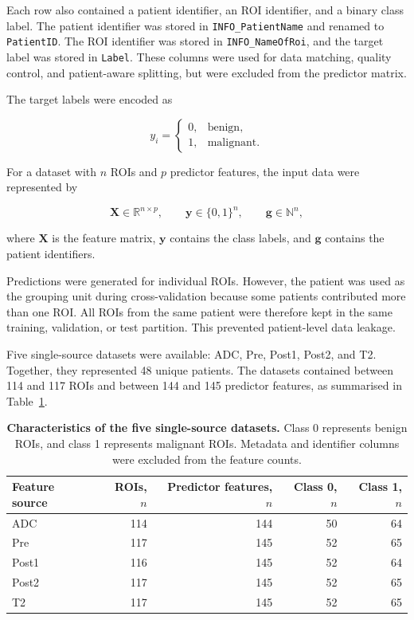 \documentclass[12pt,twocolumn]{article}
\begin{document}
Each row also contained a patient identifier, an ROI identifier, and a
binary class label. The patient identifier was stored in
\texttt{INFO\_PatientName} and renamed to \texttt{PatientID}. The ROI
identifier was stored in \texttt{INFO\_NameOfRoi}, and the target label
was stored in \texttt{Label}. These columns were used for data matching,
quality control, and patient-aware splitting, but were excluded from
the predictor matrix.

The target labels were encoded as

\begin{equation}
y_i =
\begin{cases}
0, & \text{benign},\\
1, & \text{malignant}.
\end{cases}
\label{eq:class_encoding}
\end{equation}

For a dataset with \(n\) ROIs and \(p\) predictor features, the input
data were represented by

\begin{equation}
\mathbf{X} \in \mathbb{R}^{n \times p},
\qquad
\mathbf{y} \in \{0,1\}^{n},
\qquad
\mathbf{g} \in \mathbb{N}^{n},
\label{eq:data_representation}
\end{equation}

where \(\mathbf{X}\) is the feature matrix, \(\mathbf{y}\) contains the
class labels, and \(\mathbf{g}\) contains the patient identifiers.

Predictions were generated for individual ROIs. However, the patient
was used as the grouping unit during cross-validation because some
patients contributed more than one ROI. All ROIs from the same patient
were therefore kept in the same training, validation, or test
partition. This prevented patient-level data leakage.

Five single-source datasets were available: ADC, Pre, Post1, Post2,
and T2. Together, they represented 48 unique patients. The datasets
contained between 114 and 117 ROIs and between 144 and 145 predictor
features, as summarised in
Table~\ref{tab:single_source_dataset_characteristics}.

\begin{table}[htbp]
\centering
\caption{\textbf{Characteristics of the five single-source datasets.}
Class 0 represents benign ROIs, and class 1 represents malignant ROIs.
Metadata and identifier columns were excluded from the feature counts.}
\label{tab:single_source_dataset_characteristics}
\small
\begin{tabular}{lrrrr}
\toprule
\textbf{Feature source} &
\textbf{ROIs, \(n\)} &
\textbf{Predictor features, \(n\)} &
\textbf{Class 0, \(n\)} &
\textbf{Class 1, \(n\)} \\
\midrule
ADC   & 114 & 144 & 50 & 64 \\
Pre   & 117 & 145 & 52 & 65 \\
Post1 & 116 & 145 & 52 & 64 \\
Post2 & 117 & 145 & 52 & 65 \\
T2    & 117 & 145 & 52 & 65 \\
\bottomrule
\end{tabular}
\end{table}
\end{document}
